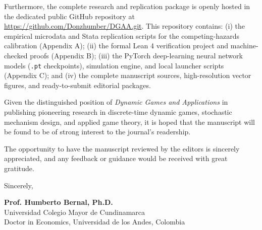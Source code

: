 \documentclass[12pt]{article}
\begin{document}
Furthermore, the complete research and replication package is openly hosted in the dedicated public GitHub repository at \url{https://github.com/Donzhumber/DGAA.git}. This repository contains: (i) the empirical microdata and Stata replication scripts for the competing-hazards calibration (Appendix A); (ii) the formal Lean 4 verification project and machine-checked proofs (Appendix B); (iii) the PyTorch deep-learning neural network models (\texttt{.pt} checkpoints), simulation engine, and local launcher scripts (Appendix C); and (iv) the complete manuscript sources, high-resolution vector figures, and ready-to-submit editorial packages.

Given the distinguished position of \textit{Dynamic Games and Applications} in publishing pioneering research in discrete-time dynamic games, stochastic mechanism design, and applied game theory, it is hoped that the manuscript will be found to be of strong interest to the journal's readership.

The opportunity to have the manuscript reviewed by the editors is sincerely appreciated, and any feedback or guidance would be received with great gratitude.

\vspace{2.5em}

\begin{flushleft}
Sincerely,

\vspace{2.5em}

\textbf{Prof. Humberto Bernal, Ph.D.} \\
Universidad Colegio Mayor de Cundinamarca \\
Doctor in Economics, Universidad de los Andes, Colombia
\end{flushleft}
\end{document}
